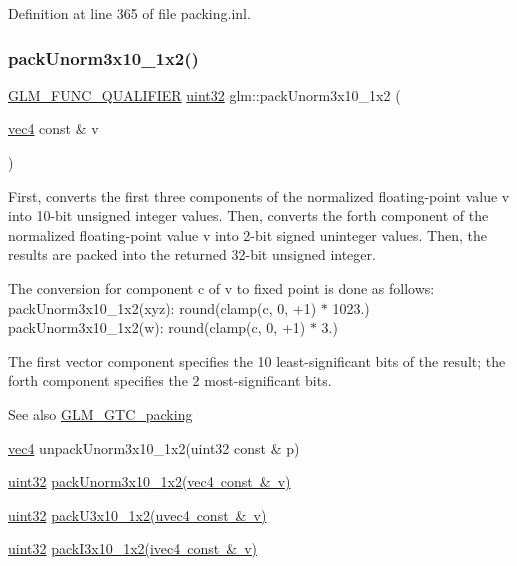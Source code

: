 Definition at line 365 of file packing.\+inl.

\mbox{\label{group__gtc__packing_ga2cf2d11b40bd48639110456fd74c2e33}} 
\subsubsection{\texorpdfstring{packUnorm3x10\_1x2()}{packUnorm3x10\_1x2()}}
{\footnotesize\ttfamily \mbox{\hyperlink{setup_8hpp_a33fdea6f91c5f834105f7415e2a64407}{G\+L\+M\+\_\+\+F\+U\+N\+C\+\_\+\+Q\+U\+A\+L\+I\+F\+I\+ER}} \mbox{\hyperlink{group__gtc__type__precision_ga202b6a53c105fcb7e531f9b443518451}{uint32}} glm\+::pack\+Unorm3x10\+\_\+1x2 (\begin{DoxyParamCaption}\item[{\mbox{\hyperlink{group__core__types_ga5881b1b022d7fd1b7218f5916532dd02}{vec4}} const \&}]{v }\end{DoxyParamCaption})}

First, converts the first three components of the normalized floating-\/point value v into 10-\/bit unsigned integer values. Then, converts the forth component of the normalized floating-\/point value v into 2-\/bit signed uninteger values. Then, the results are packed into the returned 32-\/bit unsigned integer.

The conversion for component c of v to fixed point is done as follows\+: pack\+Unorm3x10\+\_\+1x2(xyz)\+: round(clamp(c, 0, +1) $\ast$ 1023.) pack\+Unorm3x10\+\_\+1x2(w)\+: round(clamp(c, 0, +1) $\ast$ 3.)

The first vector component specifies the 10 least-\/significant bits of the result; the forth component specifies the 2 most-\/significant bits.

\begin{DoxySeeAlso}{See also}
\mbox{\hyperlink{group__gtc__packing}{G\+L\+M\+\_\+\+G\+T\+C\+\_\+packing}} 

\mbox{\hyperlink{group__core__types_ga5881b1b022d7fd1b7218f5916532dd02}{vec4}} unpack\+Unorm3x10\+\_\+1x2(uint32 const \& p) 

\mbox{\hyperlink{group__gtc__type__precision_ga202b6a53c105fcb7e531f9b443518451}{uint32}} \mbox{\hyperlink{group__gtc__packing_ga2cf2d11b40bd48639110456fd74c2e33}{pack\+Unorm3x10\+\_\+1x2(vec4 const \& v)}} 

\mbox{\hyperlink{group__gtc__type__precision_ga202b6a53c105fcb7e531f9b443518451}{uint32}} \mbox{\hyperlink{group__gtc__packing_gaf656d8862628f96b20de7a36eaa1fe56}{pack\+U3x10\+\_\+1x2(uvec4 const \& v)}} 

\mbox{\hyperlink{group__gtc__type__precision_ga202b6a53c105fcb7e531f9b443518451}{uint32}} \mbox{\hyperlink{group__gtc__packing_ga032e18fa5bc5b8f3897104aeb2f1e195}{pack\+I3x10\+\_\+1x2(ivec4 const \& v)}} 
\end{DoxySeeAlso}


